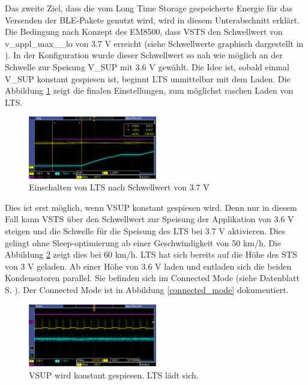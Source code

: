 Das zweite Ziel, dass die vom Long Time Storage gespeicherte Energie für das Versenden der BLE-Pakete genutzt wird, wird in diesem Unterabschnitt erklärt. Die Bedingung nach Konzept des EM8500, dass VSTS den Schwellwert von v\_appl\_max\_\_lo von 3.7 V erreicht (siehe Schwellwerte graphisch dargestellt in ). In der Konfiguration wurde dieser Schwellwert so nah wie möglich an der Schwelle zur Speisung V\_SUP mit 3.6 V gewählt. Die Idee ist, sobald einmal V\_SUP konstant gespiesen ist, beginnt LTS unmittelbar mit dem Laden. Die Abbildung \ref{lts_ein} zeigt die finalen Einstellungen, zum  möglichst raschen Laden von LTS.

\begin{figure}[ht]
   \includegraphics[width=0.5\textwidth]{4Resultate/imag/LTS_Ladeschwelle.PNG}
    \caption{Einschalten von LTS nach Schwellwert von 3.7 V}
    \label{lts_ein}
\end{figure}

Dies ist erst möglich, wenn VSUP konstant gespiesen wird. Denn nur in diesem Fall kann VSTS über den Schwellwert zur Speisung der Applikation von 3.6 V steigen und die Schwelle für die Speisung des LTS bei 3.7 V aktivieren. Dies gelingt ohne Sleep-optimierung ab einer Geschwindigkeit von 50 km/h. Die Abbildung \ref{vsup_konstant} zeigt dies bei 60 km/h. LTS hat sich bereits auf die Höhe des STS von 3 V geladen. Ab einer Höhe von 3.6 V laden und entladen sich die beiden Kondensatoren parallel. Sie befinden sich im Connected Mode (siehe Datenblatt S. ). Der Connected Mode ist in Abbildung \ref{connected_mode} dokumentiert.

\begin{figure}[ht]
   \includegraphics[width=0.5\textwidth]{4Resultate/imag/pic_5.PNG}
    \caption{VSUP wird konstant gespiesen. LTS lädt sich.}
    \label{vsup_konstant}
\end{figure}

